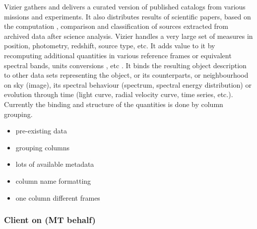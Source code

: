 \documentclass[11pt,a4paper]{ivoa}
\begin{document}
Vizier gathers and delivers a curated version of published catalogs from various missions and experiments.
It also distributes results of scientific papers, based on the computation , comparison and classification of sources extracted from archived data after science analysis.
Vizier handles a very large set of measures in position, photometry, redshift, source type, etc.
It adds value to it by recomputing additional quantities in various reference frames or equivalent spectral bands, units conversions , etc .
It binds the resulting object description to other data sets representing the object, or its counterparts, or neighbourhood on sky (image), its spectral behaviour (spectrum, spectral energy distribution) or evolution through time (light curve, radial velocity curve, time series, etc.).
Currently the binding and structure of the quantities is done by column grouping.
\begin{itemize}
    \item pre-existing data
    \item grouping columns
    \item lots of available metadata
    \item column name formatting
    \item one column different frames
\end{itemize}

\subsubsection{Client on (MT behalf)}
\end{document}
